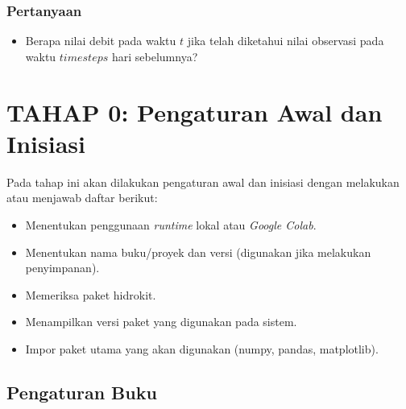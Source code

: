 \documentclass[11pt]{article}
\providecommand{\tightlist}{%
      \setlength{\itemsep}{0pt}\setlength{\parskip}{0pt}}
\begin{document}
\hypertarget{pertanyaan}{%
\subsubsection{Pertanyaan}\label{pertanyaan}}

\begin{itemize}
\tightlist
\item
  Berapa nilai debit pada waktu \(t\) jika telah diketahui nilai
  observasi pada waktu \(timesteps\) hari sebelumnya?
\end{itemize}

    \hypertarget{tahap-0-pengaturan-awal-dan-inisiasi}{%
\section{TAHAP 0: Pengaturan Awal dan
Inisiasi}\label{tahap-0-pengaturan-awal-dan-inisiasi}}

Pada tahap ini akan dilakukan pengaturan awal dan inisiasi dengan
melakukan atau menjawab daftar berikut:

\begin{itemize}
\tightlist
\item
  Menentukan penggunaan \emph{runtime} lokal atau \emph{Google Colab}.
\item
  Menentukan nama buku/proyek dan versi (digunakan jika melakukan
  penyimpanan).
\item
  Memeriksa paket hidrokit.
\item
  Menampilkan versi paket yang digunakan pada sistem.
\item
  Impor paket utama yang akan digunakan (numpy, pandas, matplotlib).
\end{itemize}

    \hypertarget{pengaturan-buku}{%
\subsection{Pengaturan Buku}\label{pengaturan-buku}}
\end{document}
